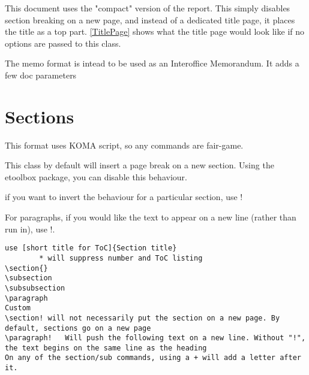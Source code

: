 \documentclass{corpboreport}
\begin{document}
This document uses the "compact" version of the report. This simply disables section breaking on a new page,
and instead of a dedicated title page, it places the title as a top part. \cref{TitlePage} shows
what the title page would look like if no options are passed to this class.

The memo format is intead to be used as an Interoffice Memorandum. It adds a few doc parameters

\section{Sections}

This format uses KOMA script, so any commands are fair-game.

This class by default will insert a page break on a new section.
Using the etoolbox package, you can disable this behaviour.

if you want to invert the behaviour for a particular section, use !

For paragraphs, if you would like the text to appear on a new line (rather than run in), use !.

\lstset{language=tex}
\begin{lstlisting}
use [short title for ToC]{Section title}
		* will suppress number and ToC listing
\section{}
\subsection
\subsubsection
\paragraph
Custom
\section! will not necessarily put the section on a new page. By default, sections go on a new page
\paragraph!   Will push the following text on a new line. Without "!", the text begins on the same line as the heading
On any of the section/sub commands, using a + will add a letter after it.
\end{lstlisting}
\end{document}

